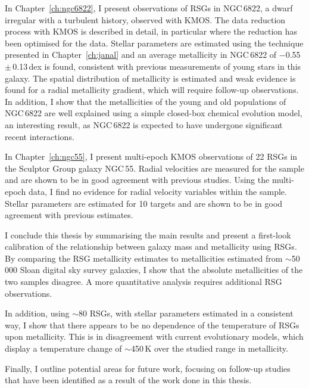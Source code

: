 In Chapter~\ref{ch:ngc6822}, I present observations of RSGs in NGC\,6822, a dwarf irregular with a turbulent history, observed with KMOS.
The data reduction process with KMOS is described in detail, in particular
where the reduction has been optimised for the data.
Stellar parameters are estimated using the technique presented in Chapter~\ref{ch:janal} and an average metallicity in NGC\,6822 of $-$0.55\,$\pm$\,0.13\,dex is found, consistent with previous measurements of young stars in this galaxy.
The spatial distribution of metallicity is estimated and weak evidence is found for a radial metallicity gradient, which will require follow-up observations.
In addition, I show that the metallicities of the young and old populations of NGC\,6822 are well explained using a simple closed-box chemical evolution model, an interesting result, as NGC\,6822 is expected to have undergone significant recent interactions.


In Chapter~\ref{ch:ngc55}, I present multi-epoch KMOS observations of 22 RSGs in the Sculptor Group galaxy NGC\,55.
Radial velocities are measured for the sample and are shown to be in good agreement with previous studies. Using the multi-epoch data, I find no evidence for radial velocity variables within the sample.
Stellar parameters are estimated for 10 targets and are shown to be in good agreement with previous estimates.

I conclude this thesis by summarising the main results and present a first-look calibration of the relationship between galaxy mass and metallicity using RSGs.
By comparing the RSG metallicity estimates to metallicities estimated from $\sim$50\,000 Sloan digital sky survey galaxies, I show that the absolute metallicities of the two samples disagree. A more quantitative analysis requires additional RSG observations.

In addition, using $\sim$80 RSGs, with stellar parameters estimated in a consistent way, I show that there appears to be no dependence of the temperature of RSGs upon metallicity.
This is in disagreement with current evolutionary models, which display a temperature change of $\sim$450\,K over the studied range in metallicity.

Finally, I outline potential areas for future work, focusing on follow-up studies that have been identified as a result of the work done in this thesis.

% 
